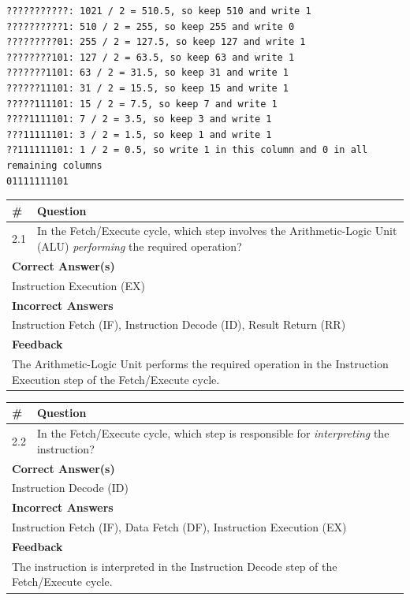 \begin{lstlisting}
???????????: 1021 / 2 = 510.5, so keep 510 and write 1
??????????1: 510 / 2 = 255, so keep 255 and write 0
?????????01: 255 / 2 = 127.5, so keep 127 and write 1
????????101: 127 / 2 = 63.5, so keep 63 and write 1
???????1101: 63 / 2 = 31.5, so keep 31 and write 1
??????11101: 31 / 2 = 15.5, so keep 15 and write 1
?????111101: 15 / 2 = 7.5, so keep 7 and write 1
????1111101: 7 / 2 = 3.5, so keep 3 and write 1
???11111101: 3 / 2 = 1.5, so keep 1 and write 1
??111111101: 1 / 2 = 0.5, so write 1 in this column and 0 in all remaining columns
01111111101
\end{lstlisting}
\noindent
\begin{tabular}{|p{0.5cm}|p{14cm}|}
\hline
\textbf{\#} & \textbf{Question} \\
\hline
2.1 & In the Fetch/Execute cycle, which step involves the Arithmetic-Logic Unit (ALU) \textit{performing} the required operation? \\
\hline
\multicolumn{2}{|l|}{\textbf{Correct Answer(s)}} \\
\multicolumn{2}{|l|}{Instruction Execution (EX)} \\
\hline
\multicolumn{2}{|l|}{\textbf{Incorrect Answers}} \\
\multicolumn{2}{|l|}{Instruction Fetch (IF), Instruction Decode (ID), Result Return (RR)} \\
\hline
\multicolumn{2}{|l|}{\textbf{Feedback}} \\
\multicolumn{2}{|p{14cm}|}{The Arithmetic-Logic Unit performs the required operation in the Instruction Execution step of the Fetch/Execute cycle.} \\
\hline
\end{tabular}

\vspace{1.5em}

\noindent
\begin{tabular}{|p{0.5cm}|p{14cm}|}
\hline
\textbf{\#} & \textbf{Question} \\
\hline
2.2 & In the Fetch/Execute cycle, which step is responsible for \textit{interpreting} the instruction? \\
\hline
\multicolumn{2}{|l|}{\textbf{Correct Answer(s)}} \\
\multicolumn{2}{|l|}{Instruction Decode (ID)} \\
\hline
\multicolumn{2}{|l|}{\textbf{Incorrect Answers}} \\
\multicolumn{2}{|l|}{Instruction Fetch (IF), Data Fetch (DF), Instruction Execution (EX)} \\
\hline
\multicolumn{2}{|l|}{\textbf{Feedback}} \\
\multicolumn{2}{|p{14cm}|}{The instruction is interpreted in the Instruction Decode step of the Fetch/Execute cycle.} \\
\hline
\end{tabular}

